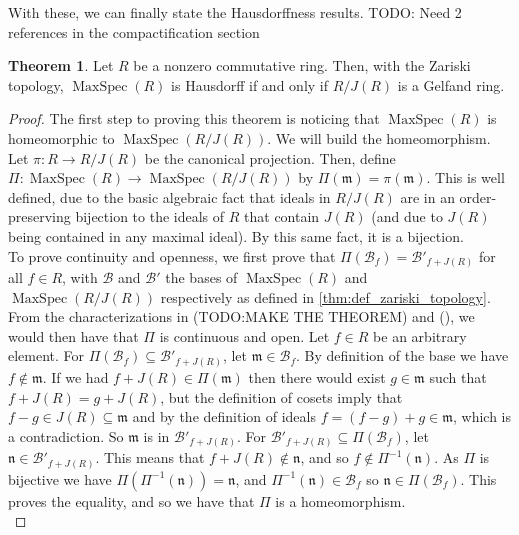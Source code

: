 \documentclass[a4paper]{book}
\theoremstyle{definition}
\newtheorem{theorem}{Theorem}[section]
\theoremstyle{ejemplo}
\theoremstyle{demostracion}
\DeclareMathOperator{\maxspec}{MaxSpec}
\begin{document}
With these, we can finally state the Hausdorffness results.
TODO: Need 2 references in the compactification section
\begin{theorem}\label{thm:zariski_hausdorff_general}
	Let $R$ be a nonzero commutative ring. Then, with the Zariski topology, $\maxspec(R)$ is Hausdorff if and only if $R/J(R)$ is a Gelfand ring.
\end{theorem}

\begin{proof}
	The first step to proving this theorem is noticing that $\maxspec(R)$ is homeomorphic to $\maxspec(R/J(R))$. We will build the homeomorphism. Let $\pi: R \rightarrow R/J(R)$ be the canonical projection. Then, define $\Pi: \maxspec(R) \rightarrow \maxspec(R/J(R))$ by $\Pi(\mathfrak{m}) = \pi(\mathfrak{m})$. This is well defined, due to the basic algebraic fact that ideals in $R/J(R)$ are in an order-preserving bijection to the ideals of $R$ that contain $J(R)$ (and due to $J(R)$ being contained in any maximal ideal). By this same fact, it is a bijection.\\ 
	To prove continuity and openness, we first prove that $\Pi(\mathcal{B}_f) = \mathcal{B}'_{f + J(R)}$ for all $f \in R$, with $\mathcal{B}$ and $\mathcal{B}'$ the bases of $\maxspec(R)$ and $\maxspec(R/J(R))$ respectively as defined in \eqref{thm:def_zariski_topology}. From the characterizations in (TODO:MAKE THE THEOREM) and (), we would then have that $\Pi$ is continuous and open. Let $f \in R$ be an arbitrary element. For $\Pi(\mathcal{B}_f) \subseteq \mathcal{B}'_{f + J(R)}$, let $\mathfrak{m} \in \mathcal{B}_f$. By definition of the base we have $f \not \in \mathfrak{m}$. If we had $f + J(R) \in \Pi(\mathfrak{m})$ then there would exist $g \in \mathfrak{m}$ such that $f + J(R) = g + J(R)$, but the definition of cosets imply that $f - g \in J(R) \subseteq \mathfrak{m}$ and by the definition of ideals $f = (f - g) + g \in \mathfrak{m}$, which is a contradiction. So $\mathfrak{m}$ is in $\mathcal{B}'_{f + J(R)}$. For $\mathcal{B}'_{f + J(R)} \subseteq \Pi(\mathcal{B}_f)$, let $\mathfrak{n} \in \mathcal{B}'_{f + J(R)}$. This means that $f + J(R) \not \in \mathfrak{n}$, and so $f \not \in \Pi^{-1}(\mathfrak{n})$. As $\Pi$ is bijective we have $\Pi(\Pi^{-1}(\mathfrak{n})) = \mathfrak{n}$, and $\Pi^{-1}(\mathfrak{n}) \in \mathcal{B}_f$ so $\mathfrak{n} \in \Pi(\mathcal{B}_f)$. This proves the equality, and so we have that $\Pi$ is a homeomorphism.\\ 
	

\end{proof}
\end{document}
